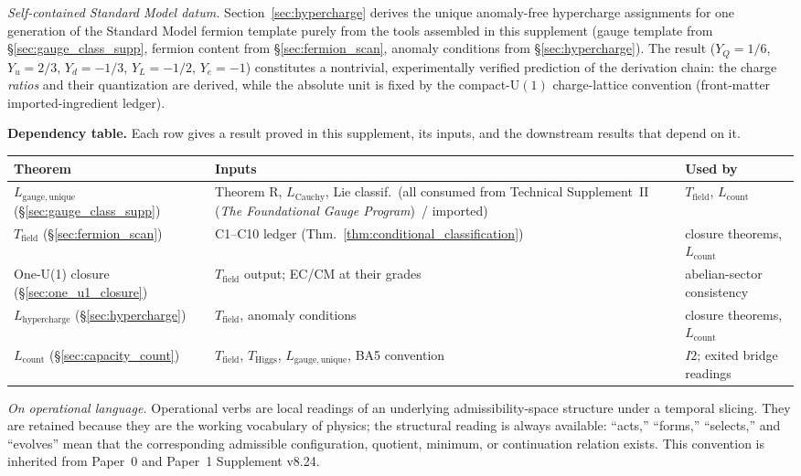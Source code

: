 \documentclass[11pt]{article}
\theoremstyle{definition}
\newcommand{\U}{\mathrm{U}}
\newcommand{\TSII}{Technical Supplement~II (\emph{The Foundational Gauge Program})}
\begin{document}
\medskip
\smallskip\noindent\textit{Self-contained Standard Model datum.}\quad
Section~\ref{sec:hypercharge} derives the unique anomaly-free hypercharge
assignments for one generation of the Standard Model fermion template
purely from the tools assembled in this supplement (gauge template from
\S\ref{sec:gauge_class_supp}, fermion content from \S\ref{sec:fermion_scan},
anomaly conditions from \S\ref{sec:hypercharge}).  The result
($Y_Q = 1/6$, $Y_u = 2/3$, $Y_d = -1/3$, $Y_L = -1/2$, $Y_e = -1$)
constitutes a nontrivial, experimentally verified prediction of the
derivation chain: the charge \emph{ratios} and their quantization are
derived, while the absolute unit is fixed by the compact-$\U(1)$
charge-lattice convention (front-matter imported-ingredient ledger).



\medskip\noindent\textbf{Dependency table.}  Each row gives a result proved in this supplement, its inputs, and the downstream results that depend on it.

\smallskip
\begin{center}\footnotesize
\renewcommand{\arraystretch}{1.15}
\begin{tabular}{@{}lp{4.9cm}p{4.3cm}@{}}
\toprule
\textbf{Theorem} & \textbf{Inputs} & \textbf{Used by} \\
\midrule
$L_{\mathrm{gauge,unique}}$ (\S\ref{sec:gauge_class_supp}) & Theorem R, $L_{\mathrm{Cauchy}}$, Lie classif.\ (all consumed from \TSII\ / imported) & $T_{\mathrm{field}}$, $L_{\mathrm{count}}$ \\
$T_{\mathrm{field}}$ (\S\ref{sec:fermion_scan}) & C1--C10 ledger (Thm.~\ref{thm:conditional_classification}) & closure theorems, $L_{\mathrm{count}}$ \\
One-U(1) closure (\S\ref{sec:one_u1_closure}) & $T_{\mathrm{field}}$ output; EC/CM at their grades & abelian-sector consistency \\
$L_{\mathrm{hypercharge}}$ (\S\ref{sec:hypercharge}) & $T_{\mathrm{field}}$, anomaly conditions & closure theorems, $L_{\mathrm{count}}$ \\
$L_{\mathrm{count}}$ (\S\ref{sec:capacity_count}) & $T_{\mathrm{field}}$, $T_{\mathrm{Higgs}}$, $L_{\mathrm{gauge,unique}}$, BA5 convention & $I2$; exited bridge readings \\
\bottomrule
\end{tabular}
\end{center}

\tableofcontents

\medskip
\noindent\textit{On operational language.}\quad
Operational verbs are local readings of an underlying admissibility-space
structure under a temporal slicing.  They are retained because they are the
working vocabulary of physics; the structural reading is always available:
``acts,'' ``forms,'' ``selects,'' and ``evolves'' mean that the corresponding
admissible configuration, quotient, minimum, or continuation relation exists.
This convention is inherited from Paper~0 and Paper~1 Supplement v8.24.
\end{document}
